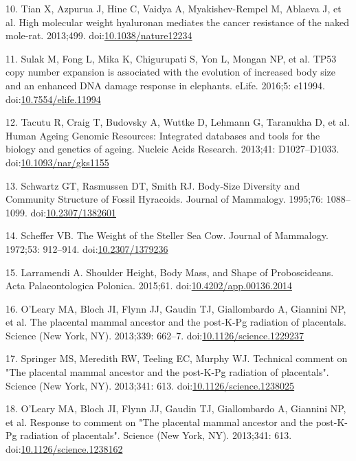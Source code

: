 \documentclass[10pt,letterpaper]{article}
\begin{document}
\leavevmode\hypertarget{ref-Tian2013}{}%
10. Tian X, Azpurua J, Hine C, Vaidya A, Myakishev-Rempel M, Ablaeva J,
et al. High molecular weight hyaluronan mediates the cancer resistance
of the naked mole-rat. 2013;499.
doi:\href{https://doi.org/10.1038/nature12234}{10.1038/nature12234}

\leavevmode\hypertarget{ref-Sulak2016}{}%
11. Sulak M, Fong L, Mika K, Chigurupati S, Yon L, Mongan NP, et al.
TP53 copy number expansion is associated with the evolution of increased
body size and an enhanced DNA damage response in elephants. eLife.
2016;5: e11994.
doi:\href{https://doi.org/10.7554/elife.11994}{10.7554/elife.11994}

\leavevmode\hypertarget{ref-HAGR}{}%
12. Tacutu R, Craig T, Budovsky A, Wuttke D, Lehmann G, Taranukha D, et
al. Human Ageing Genomic Resources: Integrated databases and tools for
the biology and genetics of ageing. Nucleic Acids Research. 2013;41:
D1027--D1033.
doi:\href{https://doi.org/10.1093/nar/gks1155}{10.1093/nar/gks1155}

\leavevmode\hypertarget{ref-Schwartz1995}{}%
13. Schwartz GT, Rasmussen DT, Smith RJ. Body-Size Diversity and
Community Structure of Fossil Hyracoids. Journal of Mammalogy. 1995;76:
1088--1099. doi:\href{https://doi.org/10.2307/1382601}{10.2307/1382601}

\leavevmode\hypertarget{ref-Scheffer1972}{}%
14. Scheffer VB. The Weight of the Steller Sea Cow. Journal of
Mammalogy. 1972;53: 912--914.
doi:\href{https://doi.org/10.2307/1379236}{10.2307/1379236}

\leavevmode\hypertarget{ref-Larramendi:20151c2}{}%
15. Larramendi A. Shoulder Height, Body Mass, and Shape of
Proboscideans. Acta Palaeontologica Polonica. 2015;61.
doi:\href{https://doi.org/10.4202/app.00136.2014}{10.4202/app.00136.2014}

\leavevmode\hypertarget{ref-OLeary2013a}{}%
16. O'Leary MA, Bloch JI, Flynn JJ, Gaudin TJ, Giallombardo A, Giannini
NP, et al. The placental mammal ancestor and the post-K-Pg radiation of
placentals. Science (New York, NY). 2013;339: 662--7.
doi:\href{https://doi.org/10.1126/science.1229237}{10.1126/science.1229237}

\leavevmode\hypertarget{ref-Springer2013}{}%
17. Springer MS, Meredith RW, Teeling EC, Murphy WJ. Technical comment
on "The placental mammal ancestor and the post-K-Pg radiation of
placentals". Science (New York, NY). 2013;341: 613.
doi:\href{https://doi.org/10.1126/science.1238025}{10.1126/science.1238025}

\leavevmode\hypertarget{ref-OLeary2013b}{}%
18. O'Leary MA, Bloch JI, Flynn JJ, Gaudin TJ, Giallombardo A, Giannini
NP, et al. Response to comment on "The placental mammal ancestor and the
post-K-Pg radiation of placentals". Science (New York, NY). 2013;341:
613.
doi:\href{https://doi.org/10.1126/science.1238162}{10.1126/science.1238162}
\end{document}
